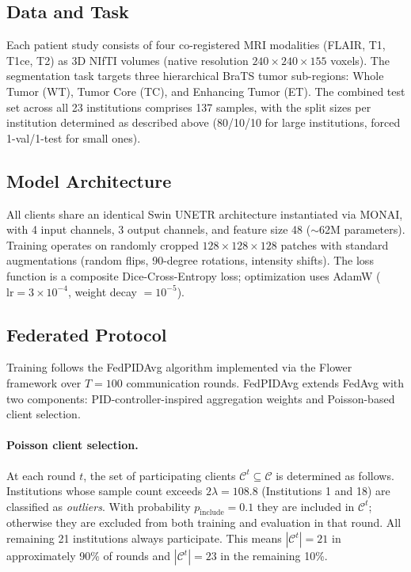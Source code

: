 \documentclass{article}
\begin{document}
\subsection{Data and Task}

Each patient study consists of four co-registered MRI modalities (FLAIR, T1, T1ce, T2) as 3D NIfTI volumes (native resolution $240 \times 240 \times 155$ voxels). The segmentation task targets three hierarchical BraTS tumor sub-regions: Whole Tumor (WT), Tumor Core (TC), and Enhancing Tumor (ET). The combined test set across all 23 institutions comprises 137 samples, with the split sizes per institution determined as described above (80/10/10 for large institutions, forced 1-val/1-test for small ones).

\subsection{Model Architecture}

All clients share an identical Swin UNETR architecture \cite{hatamizadeh_swin_2022} instantiated via MONAI, with 4 input channels, 3 output channels, and feature size 48 ($\sim$62M parameters). Training operates on randomly cropped $128 \times 128 \times 128$ patches with standard augmentations (random flips, 90-degree rotations, intensity shifts). The loss function is a composite Dice-Cross-Entropy loss; optimization uses AdamW ($\text{lr} = 3 \times 10^{-4}$, weight decay $= 10^{-5}$).

\subsection{Federated Protocol}
\label{sec:protocol}

Training follows the FedPIDAvg algorithm \cite{hatamizadeh_swin_2022_fedpidavg} implemented via the Flower framework over $T = 100$ communication rounds. FedPIDAvg extends FedAvg \cite{mcmahan_communication-efficient_2017} with two components: PID-controller-inspired aggregation weights and Poisson-based client selection.

\paragraph{Poisson client selection.} At each round $t$, the set of participating clients $\mathcal{C}^t \subseteq \mathcal{C}$ is determined as follows. Institutions whose sample count exceeds $2\lambda = 108.8$ (Institutions 1 and 18) are classified as \textit{outliers}. With probability $p_{\text{include}} = 0.1$ they are included in $\mathcal{C}^t$; otherwise they are excluded from both training and evaluation in that round. All remaining 21 institutions always participate. This means $|\mathcal{C}^t| = 21$ in approximately 90\% of rounds and $|\mathcal{C}^t| = 23$ in the remaining 10\%.
\end{document}
